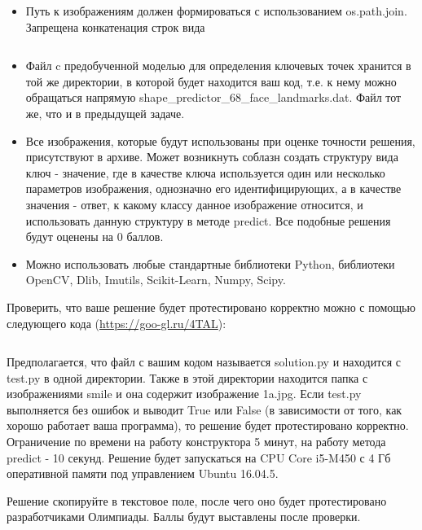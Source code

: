 \begin{itemize}
    \item Путь к изображениям должен формироваться с использованием os.path.join. Запрещена конкатенация строк вида
   
    \inputminted[fontsize=\footnotesize, linenos]{python}{2nd_tour/neuro/task_09/part_02.py}
    \item Файл c предобученной моделью для определения ключевых точек хранится в той же директории, в которой будет находится ваш код, т.е. к нему можно обращаться напрямую shape\_predictor\_68\_face\_landmarks.dat. Файл тот же, что и в предыдущей задаче.
    \item Все изображения, которые будут использованы при оценке точности решения, присутствуют в архиве. Может возникнуть соблазн создать структуру вида ключ - значение, где в качестве ключа используется один или несколько параметров изображения, однозначно его идентифицирующих, а в качестве значения - ответ, к какому классу данное изображение относится, и использовать данную структуру в методе predict. Все подобные решения будут оценены на 0 баллов.
    \item Можно использовать любые стандартные библиотеки Python, библиотеки OpenCV, Dlib, Imutils, Scikit-Learn, Numpy, Scipy.
\end{itemize}

Проверить, что ваше решение будет протестировано корректно можно с помощью следующего кода (\url{https://goo-gl.ru/4TAL}):

\inputminted[fontsize=\footnotesize, linenos]{python}{2nd_tour/neuro/task_09/part_03.py}

Предполагается, что файл с вашим кодом называется solution.py и находится с test.py в одной директории. Также в этой директории находится папка с изображениями smile и она содержит изображение 1a.jpg. Если test.py выполняется без ошибок и выводит True или False (в зависимости от того, как хорошо работает ваша программа), то решение будет протестировано корректно.
Ограничение по времени на работу конструктора 5 минут, на работу метода predict - 10 секунд. Решение будет запускаться на CPU Core i5-M450 с 4 Гб оперативной памяти под управлением Ubuntu 16.04.5.

Решение скопируйте в текстовое поле, после чего оно будет протестировано разработчиками Олимпиады. Баллы будут выставлены после проверки.


